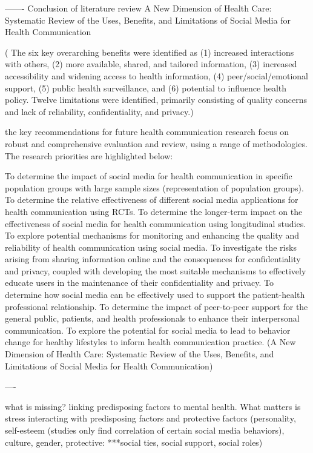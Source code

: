 -------
Conclusion of literature review 
A New Dimension of Health Care: Systematic Review of the Uses, Benefits, and Limitations of Social Media for Health Communication

( The six key overarching benefits were identified as (1) increased interactions with others, (2) more available, shared, and tailored information, (3) increased accessibility and widening access to health information, (4) peer/social/emotional support, (5) public health surveillance, and (6) potential to influence health policy. Twelve limitations were identified, primarily consisting of quality concerns and lack of reliability, confidentiality, and privacy.)


 the key recommendations for future health communication research focus on robust and comprehensive evaluation and review, using a range of methodologies. The research priorities are highlighted below:

To determine the impact of social media for health communication in specific population groups with large sample sizes (representation of population groups).
To determine the relative effectiveness of different social media applications for health communication using RCTs.
To determine the longer-term impact on the effectiveness of social media for health communication using longitudinal studies.
To explore potential mechanisms for monitoring and enhancing the quality and reliability of health communication using social media.
To investigate the risks arising from sharing information online and the consequences for confidentiality and privacy, coupled with developing the most suitable mechanisms to effectively educate users in the maintenance of their confidentiality and privacy.
To determine how social media can be effectively used to support the patient-health professional relationship.
To determine the impact of peer-to-peer support for the general public, patients, and health professionals to enhance their interpersonal communication.
To explore the potential for social media to lead to behavior change for healthy lifestyles to inform health communication practice.
(A New Dimension of Health Care: Systematic Review of the Uses, Benefits, and Limitations of Social Media for Health Communication)

----

what is missing? linking predisposing factors to mental health. What matters is stress interacting with predisposing factors and protective factors 
(personality, self-esteem (studies only find correlation of certain social media behaviors), culture, gender, protective: ***social ties, social support, social roles)




